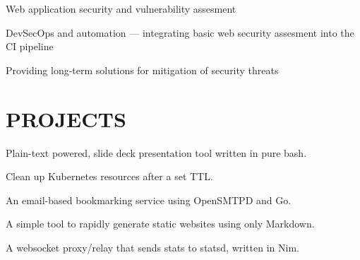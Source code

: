 \documentclass[]{config}
\begin{document}
\begin{minipage}[t]{0.66\textwidth}
\begin{tightemize}
\item Web application security and vulnerability assesment
\item DevSecOps and automation — integrating basic web security assesment into the CI pipeline
\item Providing long-term solutions for mitigation of security threats
\end{tightemize}
\sectionsep


\section{PROJECTS}

Plain-text powered, slide deck presentation tool written in pure bash. \\
\sectionsep

Clean up Kubernetes resources after a set TTL. \\
\sectionsep

An email-based bookmarking service using OpenSMTPD and Go. \\
\sectionsep

A simple tool to rapidly generate static websites using only Markdown. \\
\sectionsep

A websocket proxy/relay that sends stats to statsd, written in Nim.
\sectionsep


\end{minipage} 
\end{document}
